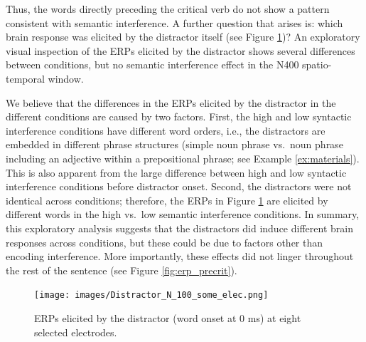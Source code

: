 \documentclass[a4paper, man, floatsintext]{apa7}
\begin{document}
Thus, the words directly preceding the critical verb do not show a pattern consistent with semantic interference. A further question that arises is: which brain response was elicited by the distractor itself (see Figure \ref{fig:erp_distractor})? An exploratory visual inspection of the ERPs elicited by the distractor shows several differences between conditions, but no semantic interference effect in the N400 spatio-temporal window. 

We believe that the differences in the ERPs elicited by the distractor in the different conditions are caused by two factors. First, the high and low syntactic interference conditions have different word orders, i.e., the distractors are embedded in different phrase structures (simple noun phrase vs.\ noun phrase including an adjective within a prepositional phrase; see Example \ref{ex:materials}). This is also apparent from the large difference between high and low syntactic interference conditions before distractor onset. Second, the distractors were not identical across conditions; therefore, the ERPs in Figure \ref{fig:erp_distractor} are elicited by different words in the high vs.\ low semantic interference conditions. In summary, this exploratory analysis suggests that the distractors did induce different brain responses across conditions, but these could be due to factors other than encoding interference. More importantly, these effects did not linger throughout the rest of the sentence (see Figure \ref{fig:erp_precrit}). 

\begin{figure}[H]
    \centering
        \caption{ERPs elicited by the distractor (word onset at 0 ms) at eight selected electrodes.}
    \label{fig:erp_distractor}\texttt{[image: images/Distractor\_N\_100\_some\_elec.png]}
\end{figure}
\end{document}
